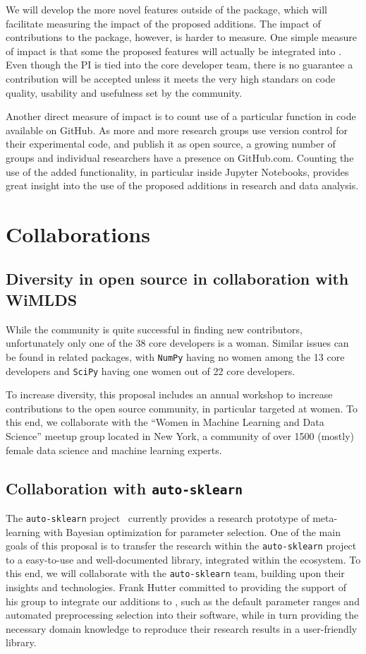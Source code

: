 We will develop the more novel features outside of the \sklearn{} package, which will
facilitate measuring the impact of the proposed additions. The impact of contributions
to the \sklearn{} package, however, is harder to measure. One simple measure of impact
is that some the proposed features will actually be integrated into \sklearn{}.
Even though the PI is tied into the core developer team, there is no guarantee
a contribution will be accepted unless it meets the very high standars
on code quality, usability and usefulness set by the community.

Another direct measure of impact is to count use of a particular function in
code available on GitHub. As more and more research groups use version
control for their experimental code, and publish it as open source, a growing
number of groups and individual researchers have a presence on GitHub.com.
Counting the use of the added functionality, in particular inside Jupyter
Notebooks, provides great insight into the use of the proposed additions in
research and data analysis.


\section{Collaborations}
\subsection{Diversity in open source in collaboration with WiMLDS}
While the \sklearn{} community is quite successful in finding new contributors,
unfortunately only one of the 38 \sklearn{} core developers is a woman.
Similar issues can be found in related packages, with \texttt{NumPy} having no
women among the 13 core developers and \texttt{SciPy} having one women out of
22 core developers.

To increase diversity, this proposal includes an annual workshop to increase
contributions to the open source community, in particular targeted at women.
To this end, we collaborate with the ``Women in Machine Learning and Data Science''
meetup group located in New York, a community of over 1500 (mostly) female data science and
machine learning experts.

\subsection{Collaboration with \texttt{auto-sklearn}}
The \texttt{auto-sklearn} project~\autocite{feurer-nips2015} currently provides
a research prototype of meta-learning with Bayesian optimization for parameter
selection. One of the main goals of this proposal is to transfer the research
within the \texttt{auto-sklearn} project to a easy-to-use and well-documented
library, integrated within the \sklearn{} ecosystem. To this end, we will
collaborate with the \texttt{auto-sklearn} team, building upon their insights
and technologies. Frank Hutter committed to providing the support of his group
to integrate our additions to \sklearn{}, such as the default parameter ranges
and automated preprocessing selection into their software, while in turn
providing the necessary domain knowledge to reproduce their research results in
a user-friendly library.

